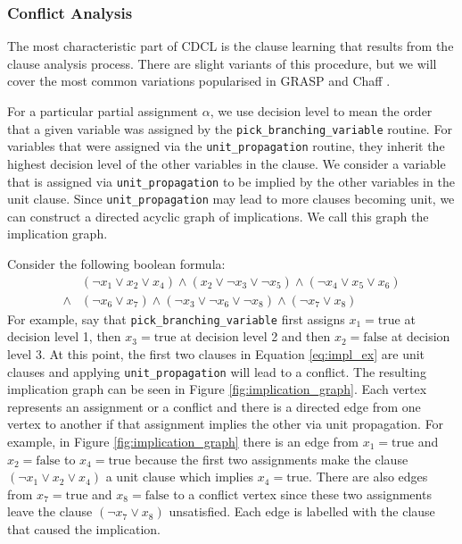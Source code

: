 \subsubsection{Conflict Analysis}
The most characteristic part of CDCL is the clause learning that results from the clause
analysis process. There are slight variants of this procedure, but we will cover the most
common variations popularised in GRASP \cite{marques1999grasp} and Chaff \cite{moskewicz2001chaff}.

For a particular partial assignment $\alpha$, we use decision level to mean the order that
a given variable was assigned by the \texttt{pick\_branching\_variable} routine. For
variables that were assigned via the \texttt{unit\_propagation} routine, they inherit the
highest decision level of the other variables in the clause. We consider a variable that
is assigned via \texttt{unit\_propagation} to be implied by the other variables in the unit clause.
Since \texttt{unit\_propagation} may lead to more clauses becoming unit, we can construct a directed
acyclic graph of implications. We call this graph the implication graph.

Consider the following boolean formula:
\begin{align}
    &(\neg x_1 \lor x_2 \lor x_4) \land (x_2 \lor \neg x_3 \lor \neg x_5) \land (\neg x_4 \lor x_5 \lor x_6) \nonumber \\
    \land &(\neg x_6 \lor x_7) \land (\neg x_3 \lor \neg x_6 \lor \neg x_8) \land (\neg x_7 \lor x_8) \label{eq:impl_ex}
\end{align}
For example, say that \texttt{pick\_branching\_variable} first assigns $x_1 = \text{true}$ at decision level 1, then
$x_3 = \text{true}$ at decision level 2 and then $x_2 = \text{false}$ at decision level 3. At this point, the first
two clauses in Equation \ref{eq:impl_ex} are unit clauses and applying \texttt{unit\_propagation} will lead to a conflict.
The resulting implication graph can be seen in Figure \ref{fig:implication_graph}. Each vertex represents an assignment
or a conflict and there is a directed edge from one vertex to another if that assignment implies the other via unit
propagation. For example, in Figure \ref{fig:implication_graph} there is an edge from $x_1 = \text{true}$ and $x_2 = \text{false}$
to $x_4 = \text{true}$ because the first two assignments make the clause $(\neg x_1 \lor x_2 \lor x_4)$ a unit clause which
implies $x_4 = \text{true}$. There are also edges from $x_7 = \text{true}$ and $x_8 = \text{false}$ to a conflict vertex since
these two assignments leave the clause $(\neg x_7 \lor x_8)$ unsatisfied. Each edge is labelled with the clause
that caused the implication.


